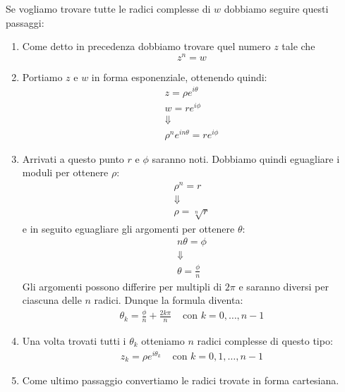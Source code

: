 Se vogliamo trovare tutte le radici complesse di $w$ dobbiamo seguire questi passaggi:
\begin{enumerate}
	\item Come detto in precedenza dobbiamo trovare quel numero $z$ tale che
	      \begin{equation*}
		      z^n = w
	      \end{equation*}
	\item Portiamo $z$ e $w$ in forma esponenziale, ottenendo quindi:
	      \begin{gather*}
		      z = \rho e^{i \theta} \\
		      w = r e^{i \phi}      \\
		      \Downarrow            \\
		      \rho^n e^{i n \theta} = r e^{i \phi}
	      \end{gather*}
	\item Arrivati a questo punto $r$ e $\phi$ saranno noti. Dobbiamo quindi eguagliare i
	      moduli per ottenere $\rho$:
	      \begin{gather*}
		      \rho^n = r \\
		      \Downarrow \\
		      \rho = \sqrt[n]{r}
	      \end{gather*}
	      e in seguito eguagliare gli argomenti per ottenere $\theta$:
	      \begin{gather*}
		      n \theta = \phi \\
		      \Downarrow      \\
		      \theta = \frac{\phi}{n}
	      \end{gather*}
	      Gli argomenti possono differire per multipli di $2 \pi$ e saranno diversi per ciascuna
	      delle $n$ radici. Dunque la formula diventa:
	      \begin{align*}
		      \theta_k = \frac{\phi}{n} + \frac{2k \pi}{n}
		       & \text{ con } k = 0, \dots, n-1
	      \end{align*}
	\item Una volta trovati tutti i $\theta_k$ otteniamo $n$ radici complesse di questo
	      tipo:
	      \begin{align*}
		      z_k = \rho e^{i \theta_k} & \text{ con } k = 0, 1, \dots, n-1
	      \end{align*}
	\item Come ultimo passaggio convertiamo le radici trovate in forma cartesiana.
\end{enumerate}

